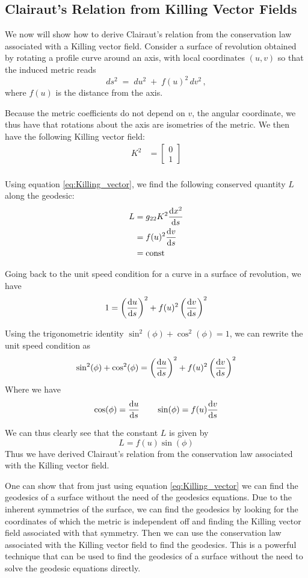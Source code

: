 \documentclass[12pt]{article}
\begin{document}
\subsection{Clairaut's Relation from Killing Vector Fields}

We now will show how to derive Clairaut's relation from the conservation law associated with a Killing vector field.
Consider a surface of revolution obtained by rotating a profile curve around an axis, with local coordinates $(u,v)$ so that the induced metric reads
$$
ds^2 \;=\; du^2 \;+\; f(u)^2\,dv^2\,,
$$
where $f(u)$ is the distance from the axis.

Because the metric coefficients do not depend on $v$, the angular coordinate, we thus have that rotations about the axis are isometries of the metric.
We then have the following Killing vector field:
\begin{align*}
	K^{2} &= \begin{bmatrix} 0 \\ 1 \end{bmatrix} \\
\end{align*}

Using equation \eqref{eq:Killing_vector}, we find the following conserved quantity $L$ along the geodesic:
\begin{align*}
	L &= g_{22} K^{2} \dv{x^{2}}{s} \\
	&= f(u)^2 \dv{v}{s} \\
	&= \text{const}
\end{align*}

Going back to the unit speed condition for a curve in a surface of revolution, we have
\begin{align*}
	1 &= \left(\dv{u}{s}\right)^2 + f(u)^2 \left(\dv{v}{s}\right)^2 \\
\end{align*}

Using the trigonometric identity \( \sin^2(\phi) + \cos^2(\phi) = 1 \), we can rewrite the unit speed condition as
\[
	\sin^2(\phi) + \cos^2(\phi) = \left(\dv{u}{s}\right)^2 + f(u)^2 \left(\dv{v}{s}\right)^2
\]
Where we have
\[
	\cos(\phi) = \dv{u}{s} \qquad \sin(\phi) = f(u)\dv{v}{s}
\]

We can thus clearly see that the constant \(L\) is given by
\[
	L = f(u) \sin(\phi)
\]
Thus we have derived Clairaut's relation from the conservation law associated with the Killing vector field.

One can show that from just using equation \eqref{eq:Killing_vector} we can find the geodesics of a surface without the need of the geodesics equations.
Due to the inherent symmetries of the surface, we can find the geodesics by looking for the coordinates of which the metric is independent off and finding the Killing vector field associated with that symmetry.
Then we can use the conservation law associated with the Killing vector field to find the geodesics.
This is a powerful technique that can be used to find the geodesics of a surface without the need to solve the geodesic equations directly.
\end{document}
